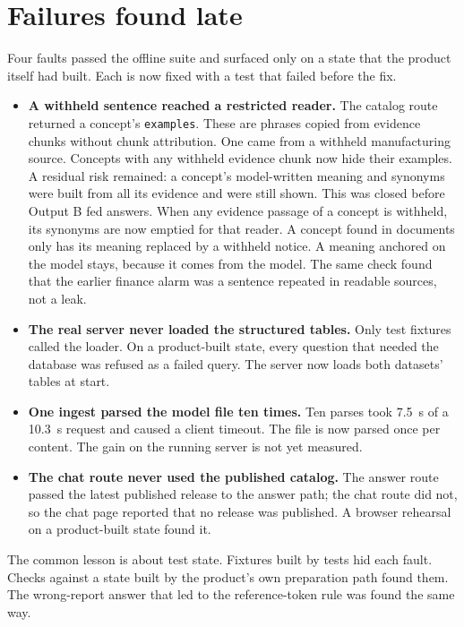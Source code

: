 \documentclass[11pt,a4paper]{article}
\begin{document}
\section{Failures found late}\label{sec:late}
Four faults passed the offline suite and surfaced only on a state that the product itself had built. Each is now fixed with a test that failed before the fix.
\begin{itemize}[nosep]
\item \textbf{A withheld sentence reached a restricted reader.} The catalog route returned a concept's \texttt{examples}. These are phrases copied from evidence chunks without chunk attribution. One came from a withheld manufacturing source. Concepts with any withheld evidence chunk now hide their examples. A residual risk remained: a concept's model-written meaning and synonyms were built from all its evidence and were still shown. This was closed before Output B fed answers. When any evidence passage of a concept is withheld, its synonyms are now emptied for that reader. A concept found in documents only has its meaning replaced by a withheld notice. A meaning anchored on the model stays, because it comes from the model. %
The same check found that the earlier finance alarm was a sentence repeated in readable sources, not a leak. %
\item \textbf{The real server never loaded the structured tables.} Only test fixtures called the loader. On a product-built state, every question that needed the database was refused as a failed query. The server now loads both datasets' tables at start. %
\item \textbf{One ingest parsed the model file ten times.} Ten parses took 7.5~s of a 10.3~s request and caused a client timeout. The file is now parsed once per content. The gain on the running server is not yet measured. %
\item \textbf{The chat route never used the published catalog.} The answer route passed the latest published release to the answer path; the chat route did not, so the chat page reported that no release was published. A browser rehearsal on a product-built state found it. %
\end{itemize}
The common lesson is about test state. Fixtures built by tests hid each fault. Checks against a state built by the product's own preparation path found them. The wrong-report answer that led to the reference-token rule was found the same way. %
\end{document}

